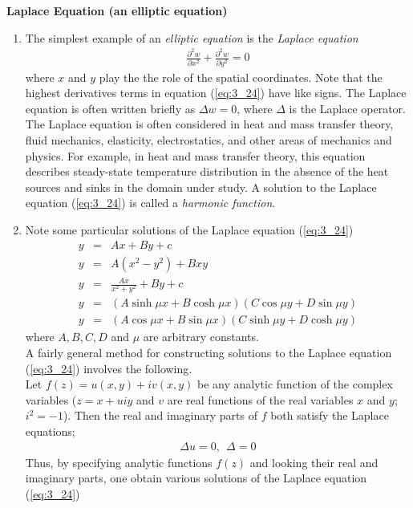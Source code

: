 \documentclass[11pt]{report}
\newcommand{\NI}{\noindent}
\newcommand{\sps}{\\[0.2cm]}
\newcommand{\refn}[1]{(\ref{#1})}
\newcommand{\refx}[1]{\refn{eq:#1}}
\newcommand{\bt}[1]{\textbf{#1}}
\begin{document}
	\NI\bt{Laplace Equation (an elliptic equation)}
	\begin{enumerate}
		\item The simplest example of an \textit{elliptic equation} is the \textit{Laplace equation}
		\begin{eqnarray}
			\frac{\partial^2 w}{\partial x^2} + \frac{\partial^2 w}{\partial y^2} = 0\label{eq:3_24}
		\end{eqnarray}
		where $x$ and $y$ play the the role of the spatial coordinates. Note that the highest derivatives terms in equation \refx{3_24} have like signs. The Laplace equation is often written briefly as $\Delta w = 0$, where $\Delta$ is the Laplace operator.\\
		
		The Laplace equation is often considered in heat and mass transfer theory, fluid mechanics, elasticity, electrostatics, and other areas of mechanics and physics. For example, in heat and mass transfer theory, this equation describes steady-state temperature distribution in the absence of the heat sources and sinks in the domain under study. A solution to the Laplace equation \refx{3_24} is called a \textit{harmonic function}.
		
		\item Note some particular solutions of the Laplace equation \refx{3_24}
		\begin{eqnarray*}
			y &=& Ax + By + c\sps
			y &=& A(x^2-y^2) + Bxy\sps
			y &=& \frac{Ax}{x^2+y^2}+By + c\sps
			y &=& (A\sinh \mu x + B\cosh\mu x)(C\cos\mu y + D\sin\mu y)\sps
			y &=& (A\cos\mu x + B\sin\mu x)(C\sinh\mu y + D\cosh\mu y)
		\end{eqnarray*}
		where $A,B,C,D$ and $\mu$ are arbitrary constants.\\
		A fairly general method for constructing solutions to the Laplace equation \refx{3_24} involves the following.\sps
		Let $f(z)=u(x,y)+ iv(x,y)$ be any analytic function of the complex variables ($z=x+uiy$ and $v$ are real functions of the real variables $x$ and $y$; $i^2=-1$). Then the real and imaginary parts of $f$ both satisfy the Laplace equations;
		\begin{eqnarray*}
			\Delta u = 0, ~~ \Delta = 0
		\end{eqnarray*}
		Thus, by specifying analytic functions $f(z)$ and looking their real and imaginary parts, one obtain various solutions of the Laplace equation \refx{3_24}
	\end{enumerate}
	
\end{document}
